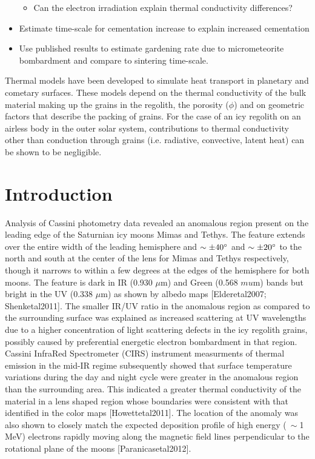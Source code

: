 \documentclass[11pt]{article} %
\begin{document}
\begin{itemize}
\begin{itemize}
		\item Can the electron irradiation explain thermal conductivity differences?
		\end{itemize}
	\item Estimate time-scale for cementation increase to explain increased cementation
	\item Use published results to estimate gardening rate due to micrometeorite bombardment and compare to sintering time-scale.
	\end{itemize}

	Thermal models have been developed to simulate heat transport in planetary and cometary surfaces. These models depend on the thermal conductivity of the bulk material making up the grains in the regolith, the porosity ($\phi$) and on geometric factors that describe the packing of grains. For the case of an icy regolith on an airless body in the outer solar system, contributions to thermal conductivity other than conduction through grains (i.e. radiative, convective, latent heat) can be shown to be negligible.

\section{Introduction}
\label{sec:intro}

	Analysis of Cassini photometry data revealed an anomalous region present on the leading edge of the Saturnian icy moons Mimas and Tethys. The feature extends over the entire width of the leading hemisphere and $\sim\pm40\degree$ and $\sim\pm20\degree$ to the north and south at the center of the lens for Mimas and Tethys respectively, though it narrows to within a few degrees at the edges of the hemisphere for both moons. The feature is dark in IR (0.930 $\mu$m) and Green (0.568 $mu$m) bands but bright in the UV (0.338 $\mu$m) as shown by albedo maps [Elderetal2007; Shenketal2011]. The smaller IR/UV ratio in the anomalous region as compared to the surrounding surface was explained as increased scattering at UV wavelengths due to a higher concentration of light scattering defects in the icy regolith grains, possibly caused by preferential energetic electron bombardment in that region. Cassini InfraRed Spectrometer (CIRS) instrument measurments of thermal emission in the mid-IR regime subsequently showed that surface temperature variations during the day and night cycle were greater in the anomalous region than the surrounding area. This indicated a greater thermal conductivity of the material in a lens shaped region whose boundaries were consistent with that identified in the color maps [Howettetal2011]. The location of the anomaly was also shown to closely match the expected deposition profile of high energy ($\>\sim$1 MeV) electrons rapidly moving along the magnetic field lines perpendicular to the rotational plane of the moons [Paranicasetal2012].
\end{document}
